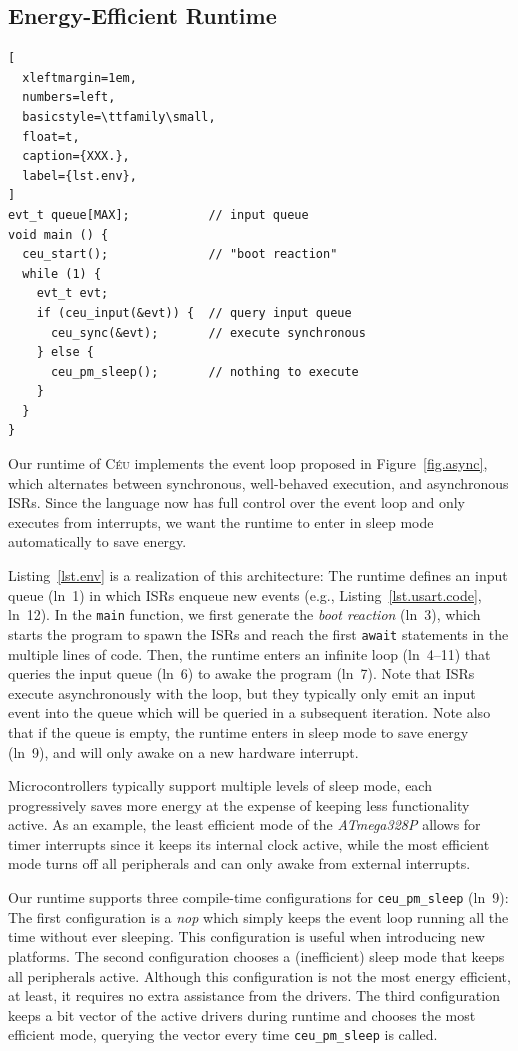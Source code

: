 \documentclass[sigplan,10pt,review,anonymous]{acmart}\settopmatter{printfolios=true,printccs=false,printacmref=false}
\newcommand{\CEU}{\textsc{C\'{e}u}\xspace}
\newcommand{\code}[1] {{\small{\texttt{#1}}}}
\begin{document}
\subsection{Energy-Efficient Runtime}
\label{sec.energy}

\begin{lstlisting}[
  xleftmargin=1em,
  numbers=left,
  basicstyle=\ttfamily\small,
  float=t,
  caption={XXX.},
  label={lst.env},
]
evt_t queue[MAX];           // input queue
void main () {
  ceu_start();              // "boot reaction"
  while (1) {
    evt_t evt;
    if (ceu_input(&evt)) {  // query input queue
      ceu_sync(&evt);       // execute synchronous
    } else {
      ceu_pm_sleep();       // nothing to execute
    }
  }
}
\end{lstlisting}

Our runtime of \CEU implements the event loop proposed in
Figure~\ref{fig.async}, which alternates between synchronous, well-behaved
execution, and asynchronous ISRs.
%
Since the language now has full control over the event loop and only executes
from interrupts, we want the runtime to enter in sleep mode automatically to
save energy.

Listing~\ref{lst.env} is a realization of this architecture:
%
The runtime defines an input queue (ln~1) in which ISRs enqueue new events
(e.g., Listing~\ref{lst.usart.code}, ln~12).
%
In the \code{main} function, we first generate the \emph{boot reaction} (ln~3),
which starts the program to spawn the ISRs and reach the first \code{await}
statements in the multiple lines of code.
%
Then, the runtime enters an infinite loop (ln~4--11) that queries the input
queue (ln~6) to awake the program (ln~7).
%
Note that ISRs execute asynchronously with the loop, but they typically only
emit an input event into the queue which will be queried in a subsequent
iteration.
%
Note also that if the queue is empty, the runtime enters in sleep mode to save
energy (ln~9), and will only awake on a new hardware interrupt.

Microcontrollers typically support multiple levels of sleep mode, each
progressively saves more energy at the expense of keeping less functionality
active.
%
As an example, the least efficient mode of the \emph{ATmega328P} allows for
timer interrupts since it keeps its internal clock active, while the most
efficient mode turns off all peripherals and can only awake from external
interrupts.

Our runtime supports three compile-time configurations for \code{ceu\_pm\_sleep}
(ln~9):
%
The first configuration is a \emph{nop} which simply keeps the event loop
running all the time without ever sleeping.
This configuration is useful when introducing new platforms.
%
The second configuration chooses a (inefficient) sleep mode that keeps all
peripherals active.
Although this configuration is not the most energy efficient, at least, it
requires no extra assistance from the drivers.
%
The third configuration keeps a bit vector of the active drivers during runtime
and chooses the most efficient mode, querying the vector every time
\code{ceu\_pm\_sleep} is called.
\end{document}
